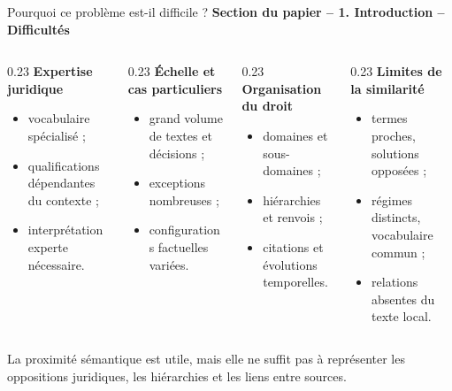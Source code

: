 \documentclass[aspectratio=169,10pt]{beamer}
\newcommand{\keybox}[1]{%
  \begin{center}
  \colorbox{accentsoft}{\parbox{0.92\linewidth}{\centering #1}}
  \end{center}}
\newcommand{\papersection}[1]{%
  {\scriptsize\textcolor{accent}{\textbf{Section du papier -- #1}}}\par\vspace{0.55em}}
\begin{document}
\begin{frame}{Pourquoi ce problème est-il difficile ?}
  \papersection{1. Introduction -- Difficultés}
  \scriptsize
  \begin{columns}[T,onlytextwidth]
    \begin{column}{0.23\textwidth}
      \textbf{\color{accent}Expertise juridique}
      \begin{itemize}\setlength{\itemsep}{0.3em}
        \item vocabulaire spécialisé ;
        \item qualifications dépendantes du contexte ;
        \item interprétation experte nécessaire.
      \end{itemize}
    \end{column}
    \begin{column}{0.23\textwidth}
      \textbf{\color{ok}Échelle et cas particuliers}
      \begin{itemize}\setlength{\itemsep}{0.3em}
        \item grand volume de textes et décisions ;
        \item exceptions nombreuses ;
        \item configurations factuelles variées.
      \end{itemize}
    \end{column}
    \begin{column}{0.23\textwidth}
      \textbf{\color{crosscol}Organisation du droit}
      \begin{itemize}\setlength{\itemsep}{0.3em}
        \item domaines et sous-domaines ;
        \item hiérarchies et renvois ;
        \item citations et évolutions temporelles.
      \end{itemize}
    \end{column}
    \begin{column}{0.23\textwidth}
      \textbf{\color{warning}Limites de la similarité}
      \begin{itemize}\setlength{\itemsep}{0.3em}
        \item termes proches, solutions opposées ;
        \item régimes distincts, vocabulaire commun ;
        \item relations absentes du texte local.
      \end{itemize}
    \end{column}
  \end{columns}

  \vspace{0.65em}
  \keybox{\scriptsize La proximité sémantique est utile, mais elle ne suffit pas à représenter
  les oppositions juridiques, les hiérarchies et les liens entre sources.}
\end{frame}
\end{document}
